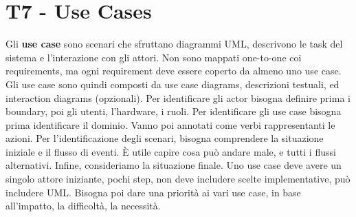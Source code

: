 \documentclass[11pt]{article}
\begin{document}
\section{T7 - Use Cases}
Gli \textbf{use case} sono scenari che sfruttano diagrammi UML, descrivono le task del sistema e l'interazione con gli attori. Non sono mappati one-to-one coi requirements, ma ogni requirement deve essere coperto da almeno uno use case. Gli use case sono quindi composti da use case diagrams, descrizioni testuali, ed interaction diagrams (opzionali).
Per identificare gli actor bisogna definire prima i boundary, poi gli utenti, l'hardware, i ruoli. Per identificare gli use case bisogna prima identificare il dominio. Vanno poi annotati come verbi rappresentanti le azioni. Per l'identificazione degli scenari, bisogna comprendere la situazione iniziale e il flusso di eventi. È utile capire cosa può andare male, e tutti i flussi alternativi. Infine, consideriamo la situazione finale. Uno use case deve avere un singolo attore iniziante, pochi step, non deve includere scelte implementative, può includere UML. Bisogna poi dare una priorità ai vari use case, in base all'impatto, la difficoltà, la necessità. 
\end{document}
